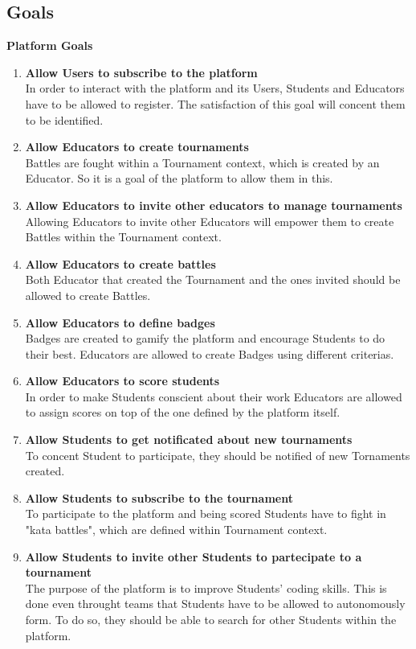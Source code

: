 \subsection{Goals}
\textbf{Platform Goals}
\begin{enumerate}[label=$\bullet$ \textbf{GP\arabic*:}]
    \item \textbf{Allow Users to subscribe to the platform}\\In order to interact with the platform and its Users, Students and Educators have to be allowed to register. The satisfaction of this goal will concent them to be identified.
    \item \textbf{Allow Educators to create tournaments}\\Battles are fought within a Tournament context, which is created by an Educator. So it is a goal of the platform to allow them in this. 
    \item \textbf{Allow Educators to invite other educators to manage tournaments}\\Allowing Educators to invite other Educators will empower them to create Battles within the Tournament context. 
    \item \textbf{Allow Educators to create battles}\\Both Educator that created the Tournament and the ones invited should be allowed to create Battles. 
    \item \textbf{Allow Educators to define badges}\\Badges are created to gamify the platform and encourage Students to do their best. Educators are allowed to create Badges using different criterias.
    \item \textbf{Allow Educators to score students}\\In order to make Students conscient about their work Educators are allowed to assign scores on top of the one defined by the platform itself.
    \item \textbf{Allow Students to get notificated about new tournaments}\\To concent Student to participate, they should be notified of new Tornaments created.
    \item \textbf{Allow Students to subscribe to the tournament}\\To participate to the platform and being scored Students have to fight in "kata battles", which are defined within Tournament context.
    \item \textbf{Allow Students to invite other Students to partecipate to a tournament}\\The purpose of the platform is to improve Students' coding skills. This is done even throught teams that Students have to be allowed to autonomously form. To do so, they should be able to search for other Students within the platform.
\end{enumerate}
